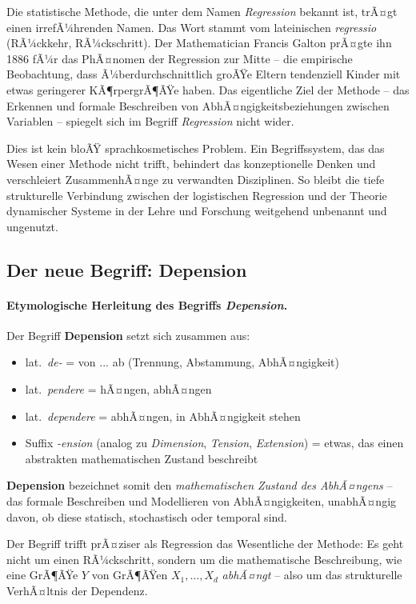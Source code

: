 ﻿\documentclass[12pt, a4paper]{article}
\theoremstyle{definition}
\theoremstyle{remark}
\begin{document}
Die statistische Methode, die unter dem Namen \emph{Regression} bekannt ist, trÃ¤gt einen
irrefÃ¼hrenden Namen. Das Wort stammt vom lateinischen \emph{regressio} (RÃ¼ckkehr,
RÃ¼ckschritt). Der Mathematician Francis Galton prÃ¤gte ihn 1886 fÃ¼r das PhÃ¤nomen der
Regression zur Mitte -- die empirische Beobachtung, dass Ã¼berdurchschnittlich groÃŸe
Eltern tendenziell Kinder mit etwas geringerer KÃ¶rpergrÃ¶ÃŸe haben.
Das eigentliche Ziel der Methode -- das Erkennen und formale Beschreiben von
AbhÃ¤ngigkeitsbeziehungen zwischen Variablen -- spiegelt sich im Begriff
\emph{Regression} nicht wider.

Dies ist kein bloÃŸ sprachkosmetisches Problem. Ein Begriffssystem, das das Wesen
einer Methode nicht trifft, behindert das konzeptionelle Denken und verschleiert
ZusammenhÃ¤nge zu verwandten Disziplinen. So bleibt die tiefe strukturelle Verbindung
zwischen der logistischen Regression und der Theorie dynamischer Systeme in der
Lehre und Forschung weitgehend unbenannt und ungenutzt.

\subsection{Der neue Begriff: Depension}

\paragraph*{Etymologische Herleitung des Begriffs \emph{Depension}.}
Der Begriff \textbf{Depension} setzt sich zusammen aus:
\begin{itemize}
  \item lat.\ \emph{de-} = von ... ab (Trennung, Abstammung, AbhÃ¤ngigkeit)
  \item lat.\ \emph{pendere} = hÃ¤ngen, abhÃ¤ngen
  \item lat.\ \emph{dependere} = abhÃ¤ngen, in AbhÃ¤ngigkeit stehen
  \item Suffix \emph{-ension} (analog zu \emph{Dimension}, \emph{Tension}, \emph{Extension})
    = etwas, das einen abstrakten mathematischen Zustand beschreibt
\end{itemize}
\medskip\noindent
\textbf{Depension} bezeichnet somit den \emph{mathematischen Zustand des AbhÃ¤ngens} --
das formale Beschreiben und Modellieren von AbhÃ¤ngigkeiten, unabhÃ¤ngig davon, ob diese
statisch, stochastisch oder temporal sind.

Der Begriff trifft prÃ¤ziser als Regression das Wesentliche der Methode: Es geht
nicht um einen RÃ¼ckschritt, sondern um die mathematische Beschreibung, wie eine
GrÃ¶ÃŸe $Y$ von GrÃ¶ÃŸen $X_1, \ldots, X_d$ \emph{abhÃ¤ngt} -- also um das
strukturelle VerhÃ¤ltnis der Dependenz.
\end{document}
